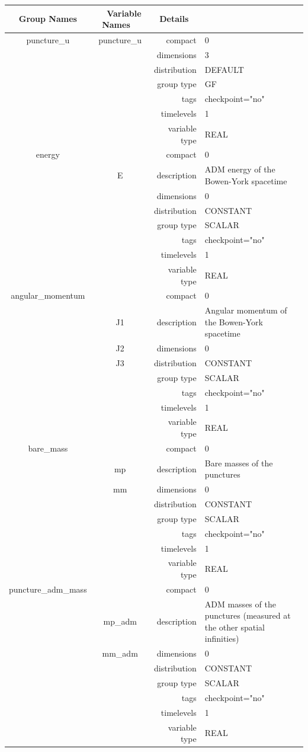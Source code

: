 \begin{tabular*}{150mm}{|c|c@{\extracolsep{\fill}}|rl|} \hline 
~ {\bf Group Names} ~ & ~ {\bf Variable Names} ~  &{\bf Details} ~ & ~\\ 
\hline 
puncture\_u & puncture\_u & compact & 0 \\ 
 &  & dimensions & 3 \\ 
 &  & distribution & DEFAULT \\ 
 &  & group type & GF \\ 
 &  & tags & checkpoint="no" \\ 
 &  & timelevels & 1 \\ 
 &  & variable type & REAL \\ 
\hline 
energy &  & compact & 0 \\ 
 & E & description & ADM energy of the Bowen-York spacetime \\ 
 &  & dimensions & 0 \\ 
 &  & distribution & CONSTANT \\ 
 &  & group type & SCALAR \\ 
 &  & tags & checkpoint="no" \\ 
 &  & timelevels & 1 \\ 
 &  & variable type & REAL \\ 
\hline 
angular\_momentum &  & compact & 0 \\ 
 & J1 & description & Angular momentum of the Bowen-York spacetime \\ 
 & J2 & dimensions & 0 \\ 
 & J3 & distribution & CONSTANT \\ 
 &  & group type & SCALAR \\ 
 &  & tags & checkpoint="no" \\ 
 &  & timelevels & 1 \\ 
 &  & variable type & REAL \\ 
\hline 
bare\_mass &  & compact & 0 \\ 
 & mp & description & Bare masses of the punctures \\ 
 & mm & dimensions & 0 \\ 
 &  & distribution & CONSTANT \\ 
 &  & group type & SCALAR \\ 
 &  & tags & checkpoint="no" \\ 
 &  & timelevels & 1 \\ 
 &  & variable type & REAL \\ 
\hline 
puncture\_adm\_mass &  & compact & 0 \\ 
 & mp\_adm & description & ADM masses of the punctures (measured at the other spatial infinities) \\ 
 & mm\_adm & dimensions & 0 \\ 
 &  & distribution & CONSTANT \\ 
 &  & group type & SCALAR \\ 
 &  & tags & checkpoint="no" \\ 
 &  & timelevels & 1 \\ 
 &  & variable type & REAL \\ 
\hline 
\end{tabular*} 



